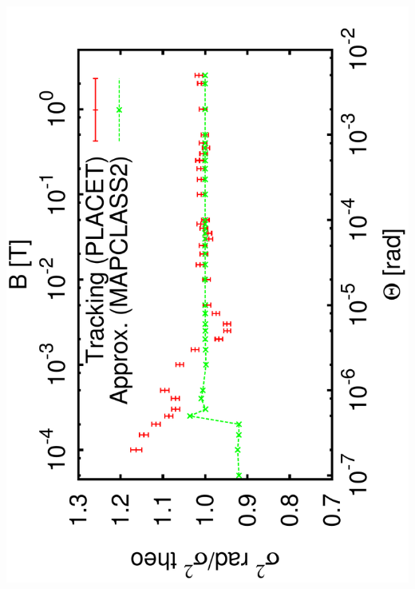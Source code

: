 \documentclass{beamer}
\begin{document}
\begin{frame}
 \includegraphics[scale=0.24,angle=-90]{sigma_angle_r06.pdf}\par

\end{frame}
\end{document}
